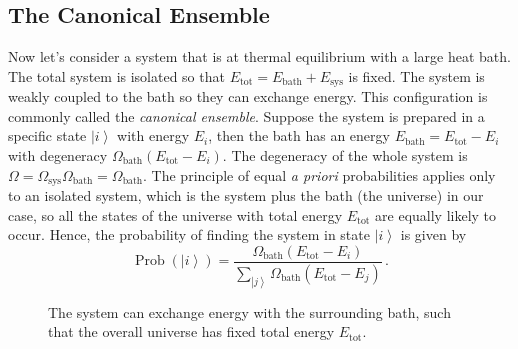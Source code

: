 \documentclass{article}
\theoremstyle{plain}\theoremheaderfont{\normalfont\bfseries}\theorembodyfont{\rmfamily}\theoremseparator{.}\newtheorem*{thm}{Theorem}\newtheorem*{law}{Law}\newtheorem*{pos}{Postulate}
\numberwithin{equation}{section}
\newcommand{\ket}[1]{\left| #1 \right\rangle}
\newcommand{\sys}{\text{sys}}
\newcommand{\bath}{\text{bath}}
\newcommand{\tot}{\text{tot}}
\DeclareMathOperator{\Prob}{Prob}
\begin{document}
    \subsection{The Canonical Ensemble}
    Now let's consider a system that is at thermal equilibrium with a large heat bath. The total system is isolated so that \(E_{\tot}=E_{\bath}+E_{\sys}\) is fixed. The system is weakly coupled to the bath so they can exchange energy. This configuration is commonly called the \textit{canonical ensemble}. Suppose the system is prepared in a specific state \(\ket{i}\) with energy \(E_i\), then the bath has an energy \(E_{\bath}=E_{\tot}-E_i\) with degeneracy \(\Omega_{\bath}(E_{\tot}-E_i)\). The degeneracy of the whole system is \(\Omega=\Omega_{\sys}\Omega_{\bath}=\Omega_{\bath}\). The principle of equal \textit{a priori} probabilities applies only to an isolated system, which is the system plus the bath (the universe) in our case, so all the states of the universe with total energy \(E_{\tot}\) are equally likely to occur. Hence, the probability of finding the system in state \(\ket{i}\) is given by
    \begin{equation}
        \Prob(\ket{i})=\frac{\Omega_{\bath}(E_{\tot}-E_i)}{\sum_{\ket{j}}\Omega_{\bath}(E_{\tot}-E_j)}\,.
    \end{equation}

    \begin{figure}[ht!]
        \centering
        \caption{The system can exchange energy with the surrounding bath, such that the overall universe has fixed total energy \(E_{\tot}\).}
        \label{Fig:CanonicalEnsemble}
    \end{figure}
\end{document}
